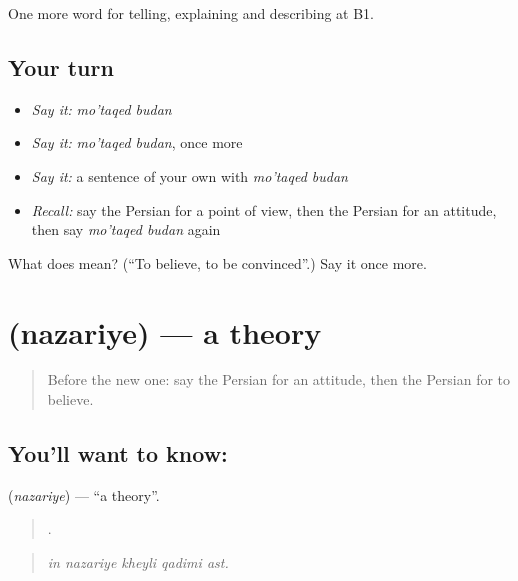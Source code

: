 \begin{grammarlens}[title={What you've built}]
One more word for telling, explaining and describing at B1.
\end{grammarlens}

\subsection*{Your turn}
\begin{itemize}
\raggedright
  \item \emph{Say it:} \emph{mo'taqed budan}
  \item \emph{Say it:} \emph{mo'taqed budan}, once more
  \item \emph{Say it:} a sentence of your own with \emph{mo'taqed budan}
  \item \emph{Recall:} say the Persian for a point of view, then the Persian for an attitude, then say \emph{mo'taqed budan} again
\end{itemize}

\begin{tcolorbox}[breakable,colback=teal!4,colframe=teal!35!black,title={Before you move on}]
What does   mean? (\textquotedblleft{}To believe, to be convinced\textquotedblright{}.) Say it once more.
\end{tcolorbox}
\section[\texorpdfstring{\fa{نظریه} (nazariye)}{نظریه (nazariye)}]{ (nazariye) — a theory}

\label{lesson:FA-C360-nazariye}



\begin{quote}
Before the new one: say the Persian for an attitude, then the Persian for to believe.
\end{quote}

\subsection*{You'll want to know: }
\textbf{} (\emph{nazariye}) — \textquotedblleft{}a theory\textquotedblright{}.

\begin{quote}
    .
\end{quote}

\begin{quote}
\emph{in nazariye kheyli qadimi ast.}
\end{quote}

